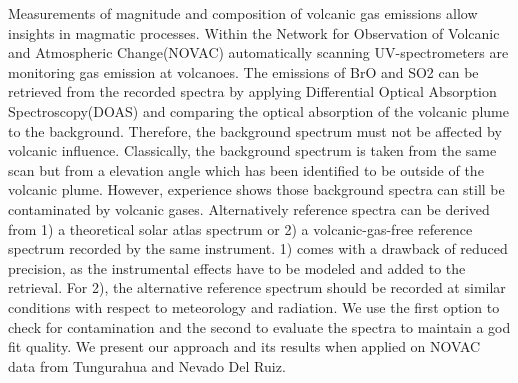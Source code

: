 

Measurements of magnitude and composition of volcanic gas emissions allow insights in magmatic processes. Within the Network for Observation of Volcanic and Atmospheric Change(NOVAC) automatically scanning UV-spectrometers are monitoring gas emission at  volcanoes. The emissions of BrO and SO2 can be retrieved from the recorded spectra by applying Differential Optical Absorption Spectroscopy(DOAS) and comparing the optical absorption of the volcanic plume to the background. Therefore, the background spectrum must not be affected by volcanic influence. Classically, the background spectrum is taken from the same scan but from a elevation angle which has been identified to be outside of the volcanic plume. However, experience shows those background spectra can still be contaminated by volcanic gases.  Alternatively reference spectra can be derived from 1) a theoretical solar atlas spectrum or 2) a volcanic-gas-free reference spectrum recorded by the same instrument. 1) comes with a drawback of reduced precision, as the instrumental effects have to be modeled and added to the retrieval. For 2), the alternative reference spectrum should be recorded at similar conditions with respect to meteorology and radiation. We use the first option to check for contamination and the second to evaluate the spectra to maintain a god fit quality. We present our approach and its results when applied on NOVAC data from Tungurahua and Nevado Del Ruiz.
